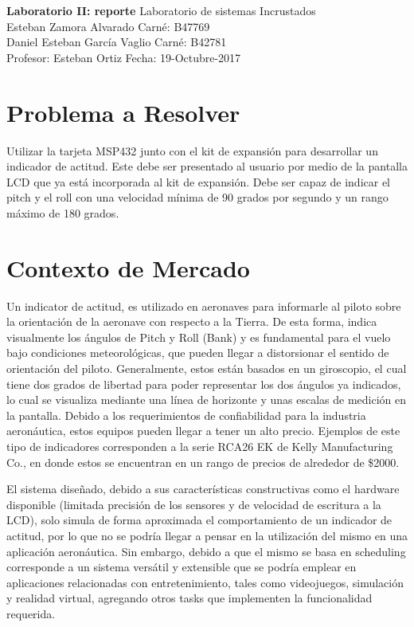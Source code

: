 

\noindent
\large\textbf{Laboratorio II: reporte} \hfill Laboratorio de sistemas Incrustados \\
\normalsize Esteban Zamora Alvarado \hfill Carné: B47769 \\
Daniel Esteban García Vaglio \hfill Carné: B42781 \\
Profesor: Esteban Ortiz  \hfill Fecha: 19-Octubre-2017 \\

\section{Problema a Resolver}

Utilizar la tarjeta MSP432 junto con el kit de expansión para desarrollar un
indicador de actitud. Este debe ser presentado al usuario por medio de la
pantalla LCD que ya está incorporada al kit de expansión. Debe ser capaz de
indicar el pitch y el roll con una velocidad mínima de 90 grados por segundo y
un rango máximo de 180 grados.

\section{Contexto de Mercado}
Un indicator de actitud, es utilizado en aeronaves para informarle al piloto
sobre la orientación de la aeronave con respecto a la Tierra. De esta forma,
indica visualmente los ángulos de Pitch y Roll (Bank) y es fundamental para el
vuelo bajo condiciones meteorológicas, que pueden llegar a distorsionar el
sentido de orientación del piloto. Generalmente, estos están basados en un
giroscopio, el cual tiene dos grados de libertad para poder representar los dos
ángulos ya indicados, lo cual se visualiza mediante una línea de horizonte y
unas escalas de medición en la pantalla. Debido a los requerimientos de
confiabilidad para la industria aeronáutica, estos equipos pueden llegar a tener
un alto precio. Ejemplos de este tipo de indicadores corresponden a la serie
RCA26 EK de Kelly Manufacturing Co., en donde estos se encuentran en un rango
de precios de alrededor de \$2000.

El sistema diseñado, debido a sus características constructivas como el hardware
disponible (limitada precisión de los sensores y de velocidad de escritura a la
LCD), solo simula de forma aproximada el comportamiento de un indicador de
actitud, por lo que no se podría llegar a pensar en la utilización del mismo en
una aplicación aeronáutica. Sin embargo, debido a que el mismo se basa en
scheduling corresponde a un sistema versátil y extensible que se podría emplear
en aplicaciones relacionadas con entretenimiento, tales como videojuegos,
simulación y realidad virtual, agregando otros tasks que implementen la
funcionalidad requerida.

